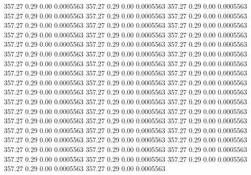  357.27    0.29    0.00   0.0005563
 357.27    0.29    0.00   0.0005563
 357.27    0.29    0.00   0.0005563
 357.27    0.29    0.00   0.0005563
 357.27    0.29    0.00   0.0005563
 357.27    0.29    0.00   0.0005563
 357.27    0.29    0.00   0.0005563
 357.27    0.29    0.00   0.0005563
 357.27    0.29    0.00   0.0005563
 357.27    0.29    0.00   0.0005563
 357.27    0.29    0.00   0.0005563
 357.27    0.29    0.00   0.0005563
 357.27    0.29    0.00   0.0005563
 357.27    0.29    0.00   0.0005563
 357.27    0.29    0.00   0.0005563
 357.27    0.29    0.00   0.0005563
 357.27    0.29    0.00   0.0005563
 357.27    0.29    0.00   0.0005563
 357.27    0.29    0.00   0.0005563
 357.27    0.29    0.00   0.0005563
 357.27    0.29    0.00   0.0005563
 357.27    0.29    0.00   0.0005563
 357.27    0.29    0.00   0.0005563
 357.27    0.29    0.00   0.0005563
 357.27    0.29    0.00   0.0005563
 357.27    0.29    0.00   0.0005563
 357.27    0.29    0.00   0.0005563
 357.27    0.29    0.00   0.0005563
 357.27    0.29    0.00   0.0005563
 357.27    0.29    0.00   0.0005563
 357.27    0.29    0.00   0.0005563
 357.27    0.29    0.00   0.0005563
 357.27    0.29    0.00   0.0005563
 357.27    0.29    0.00   0.0005563
 357.27    0.29    0.00   0.0005563
 357.27    0.29    0.00   0.0005563
 357.27    0.29    0.00   0.0005563
 357.27    0.29    0.00   0.0005563
 357.27    0.29    0.00   0.0005563
 357.27    0.29    0.00   0.0005563
 357.27    0.29    0.00   0.0005563
 357.27    0.29    0.00   0.0005563
 357.27    0.29    0.00   0.0005563
 357.27    0.29    0.00   0.0005563
 357.27    0.29    0.00   0.0005563
 357.27    0.29    0.00   0.0005563
 357.27    0.29    0.00   0.0005563
 357.27    0.29    0.00   0.0005563
 357.27    0.29    0.00   0.0005563
 357.27    0.29    0.00   0.0005563
 357.27    0.29    0.00   0.0005563
 357.27    0.29    0.00   0.0005563
 357.27    0.29    0.00   0.0005563
